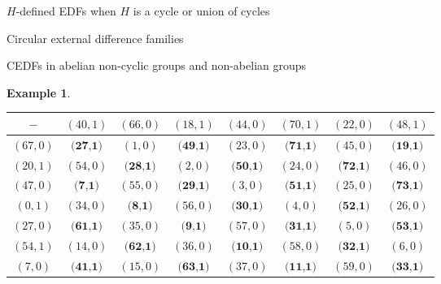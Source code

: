 \documentclass[12pt, a4paper]{article}
\theoremstyle{definition}
\newtheorem{example}[theorem]{Example}
\begin{document}
\begin{section}{$H$-defined EDFs when $H$ is a cycle or union of cycles}
\begin{subsection}{Circular external difference families}
\begin{subsection}{CEDFs in abelian non-cyclic groups and non-abelian groups}
\begin{example}
\begin{table}[h]
\renewcommand{\arraystretch}{1.2}
\centering
\setlength\tabcolsep{3pt}
\begin{tabular}{|c|ccccccc|} 
\hline
$-$ & $(40,1)$ & $(66,0)$ &$(18,1)$&$ (44,0)$&$ (70,1) $&$(22,0) $&$(48,1)$ \\ \hline
$(67,0)$ & $ \textbf{(27,1)}	$&$(1,0)	$&$\textbf{(49,1)}	$&$(23,0)	$&$\textbf{(71,1)}	$&$(45,0)	$&$\textbf{(19,1)}$ \\
$(20,1)$ & $ (54,0)	$&$\textbf{(28,1)}	$&$(2,0)	$&$\textbf{(50,1)}	$&$(24,0)	$&$\textbf{(72,1)}	$&$(46,0)$ \\
$(47,0)$ & $ \textbf{(7,1)}	$&$(55,0)	$&$\textbf{(29,1)}	$&$(3,0)	$&$\textbf{(51,1)}	$&$(25,0)	$&$\textbf{(73,1)}$ \\
$(0,1)$ & $ (34,0)	$&$\textbf{(8,1)}	$&$(56,0)	$&$\textbf{(30,1)}	$&$(4,0)	$&$\textbf{(52,1)}$&$	(26,0)$ \\
$(27,0)$ & $ \textbf{(61,1)}	$&$(35,0)	$&$\textbf{(9,1)}	$&$(57,0)	$&$\textbf{(31,1)}	$&$(5,0)	$&$\textbf{(53,1)}$ \\
$(54,1)$ & $ (14,0) $&$	\textbf{(62,1)}	$&$(36,0)	$&$\textbf{(10,1)}	$&$(58,0)	$&$\textbf{(32,1)}	$&$(6,0)$ \\
$(7,0)$ & $ \textbf{(41,1)}	$&$(15,0)	$&$\textbf{(63,1)}	$&$(37,0)	$&$\textbf{(11,1)}	$&$(59,0)	$&$\textbf{(33,1)}$ \\
\hline
\end{tabular}
	

\end{table}
\end{example}
\end{subsection}
\end{subsection}
\end{section}
\end{document}
